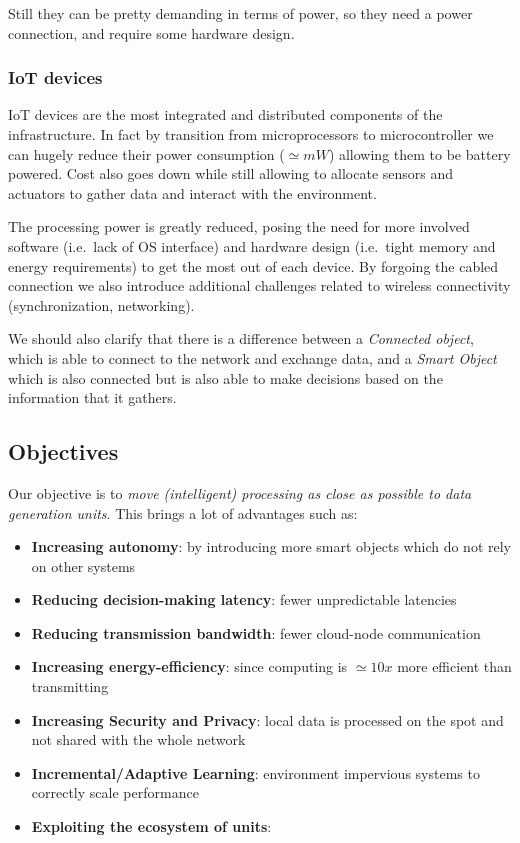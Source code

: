 \documentclass{article}
\begin{document}
      Still they can be pretty demanding in terms of power, so they need a power connection, and require some hardware design.

      \subsubsection{IoT devices}
      IoT devices are the most integrated and distributed components of the infrastructure. In fact by transition from microprocessors to microcontroller we can hugely reduce their power consumption ($\simeq mW$)
      allowing them to be battery powered. Cost also goes down while still allowing to allocate sensors and actuators to gather data and interact with the environment.

      The processing power is greatly reduced, posing the need for more involved software (i.e.\ lack of OS interface) and hardware design (i.e.\ tight memory and energy requirements)
      to get the most out of each device. By forgoing the cabled connection we also introduce additional challenges related to wireless connectivity (synchronization, networking).

      We should also clarify that there is a difference between a \emph{Connected object}, which is able to connect to the network and exchange data, and a \emph{Smart Object} which is also connected but is also able to
      make decisions based on the information that it gathers.
  
  \subsection{Objectives}
    Our objective is to \emph{move (intelligent) processing as close as possible to data generation units}. This brings a lot of advantages such as:
    \begin{itemize}
      \item \textbf{Increasing autonomy}: by introducing more smart objects which do not rely on other systems
      \item \textbf{Reducing decision-making latency}: fewer unpredictable latencies
      \item \textbf{Reducing transmission bandwidth}: fewer cloud-node communication
      \item \textbf{Increasing energy-efficiency}: since computing is $\simeq 10x$ more efficient than transmitting
      \item \textbf{Increasing Security and Privacy}: local data is processed on the spot and not shared with the whole network
      \item \textbf{Incremental/Adaptive Learning}: environment impervious systems to correctly scale performance
      \item \textbf{Exploiting the ecosystem of units}:
    \end{itemize}
\end{document}
